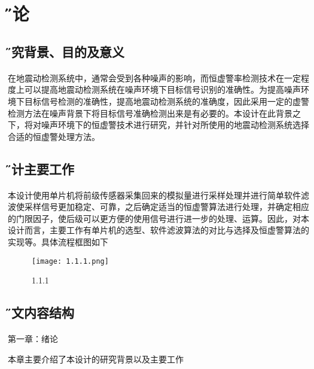 \documentclass[12pt]{article} %
\newcommand{\sihao}{\fontsize{14pt}{\baselineskip}\selectfont}%
\newcommand{\xiaosanhao}{\fontsize{15pt}{\baselineskip}\selectfont}    %
\begin{document}
\renewcommand{\contentsname}{\centerline{ \sihao \H 目\quad 录}}
  \tableofcontents 
    \newpage
  
     
 \section{\xiaosanhao \H 绪论}  
  
 	 \subsection{\H 研究背景、目的及意义}
 	 \paragraph{ \quad} 在地震动检测系统中，通常会受到各种噪声的影响，而恒虚警率检测技术在一定程度上可以提高地震动检测系统在噪声环境下目标信号识别的准确性。为提高噪声环境下目标信号检测的准确性，提高地震动检测系统的准确度，因此采用一定的虚警检测方法在噪声背景下将目标信号准确检测出来是有必要的。本设计在此背景之下，将对噪声环境下的恒虚警技术进行研究，并针对所使用的地震动检测系统选择合适的恒虚警处理方法。
 	 
 	 
 	 \subsection{\H 设计主要工作}
 	 \paragraph{ \quad} 本设计使用单片机将前级传感器采集回来的模拟量进行采样处理并进行简单软件滤波使采样信号更加稳定、可靠，之后确定适当的恒虚警算法进行处理，并确定相应的门限因子，使后级可以更方便的使用信号进行进一步的处理、运算。因此，对本设计而言，主要工作有单片机的选型、软件滤波算法的对比与选择及恒虚警算法的实现等。具体流程框图如下
 	 
 	 \begin{figure}[htbp] %
 		  \centering
 		  \texttt{[image: 1.1.1.png]} 
  		  \caption{1.1.1 }
  		 \label{fig:1.1.1}
		\end{figure}
 	 
 	 
 	  \subsection{\H 论文内容结构}
         \paragraph{ \quad} 第一章：绪论
         \par 本章主要介绍了本设计的研究背景以及主要工作
\end{document}
